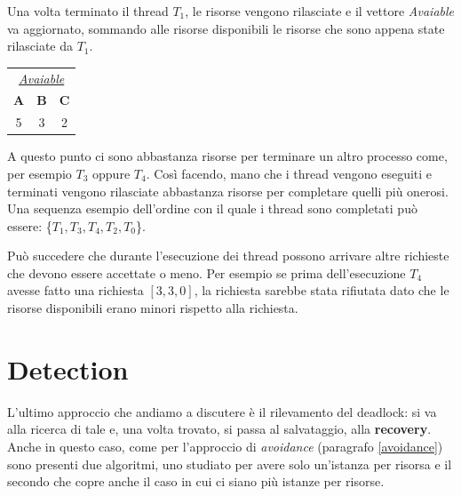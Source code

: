 \pagebreak Una volta terminato il thread $T_1$, le risorse vengono rilasciate e il vettore \textit{Avaiable} va aggiornato, sommando alle risorse disponibili le risorse che sono appena state rilasciate da $T_1$.
\begin{table}[h!]
    \centering
    \begin{tabular}{c c c}
         \multicolumn{3}{c}{\underline{\textit{Avaiable}}} \\
         \textbf{A} & \textbf{B} & \textbf{C} \\
         5 & 3 & 2
    \end{tabular}
\end{table}

A questo punto ci sono abbastanza risorse per terminare un altro processo come, per esempio $T_3$ oppure $T_4$. Così facendo, mano che i thread vengono eseguiti e terminati vengono rilasciate abbastanza risorse per completare quelli più onerosi. Una sequenza esempio dell'ordine con il quale i thread sono completati può essere: \{$T_1,T_3,T_4,T_2,T_0$\}. 

Può succedere che durante l'esecuzione dei thread possono arrivare altre richieste che devono essere accettate o meno. Per esempio se prima dell'esecuzione $T_4$ avesse fatto una richiesta $[3,3,0]$, la richiesta sarebbe stata rifiutata dato che le risorse disponibili erano minori rispetto alla richiesta.
% 
\section{Detection}
L'ultimo approccio che andiamo a discutere è il rilevamento del deadlock: si va alla ricerca di tale e, una volta trovato, si passa al salvataggio, alla \textbf{recovery}. Anche in questo caso, come per l'approccio di \textit{avoidance} (paragrafo \ref{avoidance}) sono presenti due algoritmi, uno studiato per avere solo un'istanza per risorsa e il secondo che copre anche il caso in cui ci siano più istanze per risorse.



